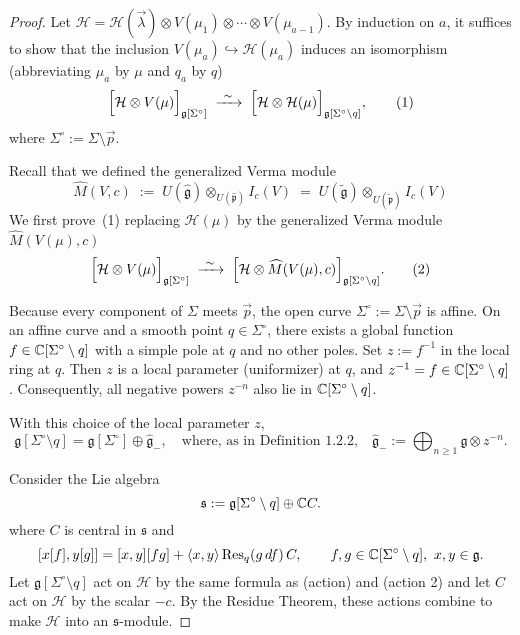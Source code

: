 \documentclass[12pt]{article}
\begin{document}
\begin{proof}
    Let $\mathcal H = \mathcal H(\vec\lambda)\otimes V(\mu_1)\otimes\cdots\otimes V(\mu_{a-1})$.
    By induction on $a$, it suffices to show that the inclusion
    $V(\mu_a)\hookrightarrow \mathcal H(\mu_a)$
    induces an isomorphism (abbreviating $\mu_a$ by $\mu$ and $q_a$ by $q$)
    \[
        \Bigl[\mathcal H\otimes V(\mu)\Bigr]_{\mathfrak g[\Sigma^{\circ}]}
        \;\xrightarrow{\ \sim\ }\;
        \Bigl[\mathcal H\otimes \mathcal H(\mu)\Bigr]_{\mathfrak g[\Sigma^{\circ}\setminus q]},
        \tag{1}
    \]
    where $\Sigma^{\circ}:=\Sigma\setminus\vec p$.

    Recall that we defined the generalized Verma module
    \[
        \widehat M(V,c)\;:=\;U(\widehat{\mathfrak g})\otimes_{U(\widehat{\mathfrak p})} I_c(V)
        \;=\; U(\widetilde{\mathfrak g})\otimes_{U(\widetilde{\mathfrak p})} I_c(V)\]
    We first prove~(1) replacing $\mathcal H(\mu)$ by the generalized
    Verma module $\widehat M(V(\mu),c)$
    \[
        \Bigl[\mathcal H\otimes V(\mu)\Bigr]_{\mathfrak g[\Sigma^{\circ}]}
        \;\xrightarrow{\ \sim\ }\;
        \Bigl[\mathcal H\otimes \widehat M(V(\mu),c)\Bigr]_{\mathfrak g[\Sigma^{\circ}\setminus q]}.
        \tag{2}
    \]

    Because every component of $\Sigma$ meets $\vec p$, the open curve
    $\Sigma^\circ:=\Sigma\setminus\vec p$ is affine. On an affine curve and a
    smooth point $q\in\Sigma^\circ$, there exists a global function
    \(f\in \mathbb{C}[\Sigma^\circ\setminus q]\) with a simple pole at $q$ and no
    other poles. Set $z:=f^{-1}$ in the local ring at $q$.
    Then $z$ is a local parameter (uniformizer) at $q$, and
    \(z^{-1}=f\in \mathbb{C}[\Sigma^\circ\setminus q]\). Consequently, all negative
    powers $z^{-n}$ also lie in \(\mathbb{C}[\Sigma^\circ\setminus q]\).

    With this choice of the local parameter $z$,
    \[
        \mathfrak g[\Sigma^{\circ}\setminus q]
        =\mathfrak g[\Sigma^{\circ}]\oplus \widehat{\mathfrak g}_{-},
        \quad\text{where, as in Definition~1.2.2,}\quad
        \widehat{\mathfrak g}_{-}:=\bigoplus_{n\ge1}\mathfrak g\otimes z^{-n}.
        \tag{3}
    \]

    Consider the Lie algebra
    \[
        \mathfrak s := \mathfrak g[\Sigma^{\circ}\setminus q]\oplus \mathbb{C} C.
    \]
    \noindent
    where $C$ is central in $\mathfrak s$ and
    \[
        [x[f],y[g]]=[x,y][fg]+\langle x,y\rangle\,\mathrm{Res}_q(g\,df)\,C,
        \qquad
        f,g\in\mathbb{C}[\Sigma^\circ\setminus q],\ x,y\in\mathfrak g.
    \]
    Let $\mathfrak g[\Sigma^\circ\setminus q]$ act on $\mathcal H$
    by the same formula as (action) and (action 2) and let $C$ act on $\mathcal H$ by the scalar $-c$.
    By the Residue Theorem, these actions combine to make $\mathcal H$ into an $\mathfrak s$-module.


\end{proof}
\end{document}
